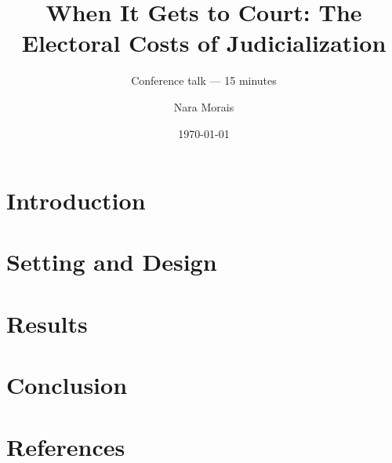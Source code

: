 \documentclass[aspectratio=169,10pt]{beamer}
\title{When It Gets to Court: The Electoral Costs of Judicialization}
\subtitle{Conference talk --- 15 minutes}
\author{Nara Morais}
\institute{FEA--USP}
\date{\today}
\begin{document}
\maketitle

\section{Introduction}




\section{Setting and Design}




\section{Results}








\section{Conclusion}


\section{References}

\end{document}
